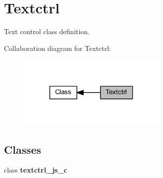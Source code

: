 \section{Textctrl}
\label{group___textctrl}


Text control class definition.  


Collaboration diagram for Textctrl\+:
\nopagebreak
\begin{figure}[H]
\begin{center}
\leavevmode
\includegraphics[width=206pt]{group___textctrl}
\end{center}
\end{figure}
\subsection*{Classes}
\begin{DoxyCompactItemize}
\item 
class \textbf{ textctrl\+\_\+js\+\_\+c}
\end{DoxyCompactItemize}

